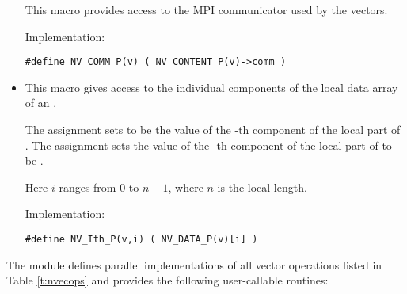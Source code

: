 \begin{itemize}
  This macro provides access to the MPI communicator used by the {\nvecp}
  vectors.

  Implementation:

  \verb|#define NV_COMM_P(v) ( NV_CONTENT_P(v)->comm )|

\item {}

  This macro gives access to the individual components of the local data
  array of an .

  The assignment  sets  to be the value of 
  the -th component of the local part of . 
  The assignment    
  sets the value of the -th component of the local part of  
  to be .        
  
  Here $i$ ranges from $0$ to $n-1$, where $n$ is the local length.
      
  Implementation:

  \verb|#define NV_Ith_P(v,i) ( NV_DATA_P(v)[i] )|

\end{itemize}
The {\nvecp} module defines parallel implementations of all vector operations listed 
in Table \ref{t:nvecops} and provides the following user-callable routines:
